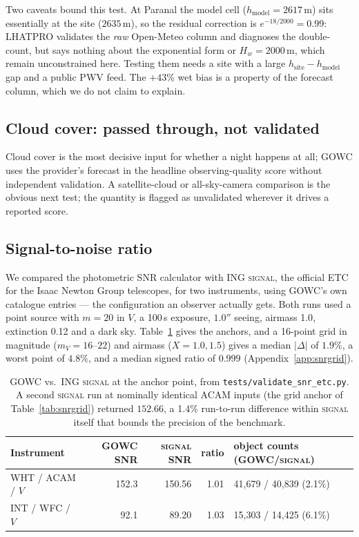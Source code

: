 \documentclass[11pt]{article}
\begin{document}
Two caveats bound this test. At Paranal the model cell ($h_{\text{model}}=2617$\,m)
sits essentially at the site ($2635$\,m), so the residual correction is
$e^{-18/2000}=0.99$: LHATPRO validates the \emph{raw} Open-Meteo column and diagnoses
the double-count, but says nothing about the exponential form or $H_w=2000$\,m,
which remain unconstrained here. Testing them needs a site with a large
$h_{\text{site}}-h_{\text{model}}$ gap and a public PWV feed. The $+43\%$ wet bias is
a property of the forecast column, which we do not claim to explain.

\subsection{Cloud cover: passed through, not validated}
Cloud cover is the most decisive input for whether a night happens at all; GOWC uses
the provider's forecast in the headline observing-quality score without independent
validation. A satellite-cloud or all-sky-camera comparison is the obvious next test;
the quantity is flagged as unvalidated wherever it drives a reported score.

\subsection{Signal-to-noise ratio}
We compared the photometric SNR calculator with ING \textsc{signal}, the official
ETC for the Isaac Newton Group telescopes, for two instruments, using GOWC's own
catalogue entries --- the configuration an observer actually gets. Both runs used a
point source with $m=20$ in $V$, a 100\,s exposure, $1.0''$ seeing, airmass 1.0,
extinction 0.12 and a dark sky. Table~\ref{tab:val} gives the anchors, and a
16-point grid in magnitude ($m_V=16$--$22$) and airmass ($X=1.0,1.5$) gives a median
$|\Delta|$ of $1.9\%$, a worst point of $4.8\%$, and a median signed ratio of $0.999$
(Appendix~\ref{app:snrgrid}).

\begin{table}[h]
\centering
\begin{tabular}{l r r r l}
\hline
\textbf{Instrument} & \textbf{GOWC SNR} & \textbf{\textsc{signal} SNR} & \textbf{ratio} & \textbf{object counts (GOWC/\textsc{signal})} \\
\hline
WHT / ACAM / $V$ & 152.3 & 150.56 & 1.01 & 41{,}679 / 40{,}839 (2.1\%) \\
INT / WFC / $V$  &  92.1 &  89.20 & 1.03 & 15{,}303 / 14{,}425 (6.1\%) \\
\hline
\end{tabular}
\caption{GOWC vs.\ ING \textsc{signal} at the anchor point, from
\texttt{tests/validate\_snr\_etc.py}. A second \textsc{signal} run at nominally
identical ACAM inputs (the grid anchor of Table~\ref{tab:snrgrid}) returned
$152.66$, a 1.4\% run-to-run difference within \textsc{signal} itself that bounds the
precision of the benchmark.}
\label{tab:val}
\end{table}
\end{document}
